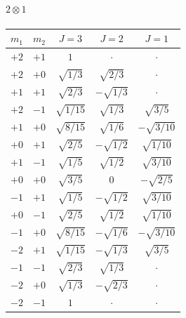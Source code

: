 \documentclass[11pt]{article}
\theoremstyle{plain}
\theoremstyle{definition}
\theoremstyle{remark}
\begin{document}
\paragraph{$2 \otimes 1$}
\begin{center}
\begin{tabular}{cc|ccc}
\toprule
$m_1$ & $m_2$ & $J=3$ & $J=2$ & $J=1$ \\
\midrule
$+2$ & $+1$ & $1$ & $\cdot$ & $\cdot$ \\
\midrule
$+2$ & $+0$ & $\sqrt{1/3}$ & $\sqrt{2/3}$ & $\cdot$ \\
$+1$ & $+1$ & $\sqrt{2/3}$ & $-\sqrt{1/3}$ & $\cdot$ \\
\midrule
$+2$ & $-1$ & $\sqrt{1/15}$ & $\sqrt{1/3}$ & $\sqrt{3/5}$ \\
$+1$ & $+0$ & $\sqrt{8/15}$ & $\sqrt{1/6}$ & $-\sqrt{3/10}$ \\
$+0$ & $+1$ & $\sqrt{2/5}$ & $-\sqrt{1/2}$ & $\sqrt{1/10}$ \\
\midrule
$+1$ & $-1$ & $\sqrt{1/5}$ & $\sqrt{1/2}$ & $\sqrt{3/10}$ \\
$+0$ & $+0$ & $\sqrt{3/5}$ & $0$ & $-\sqrt{2/5}$ \\
$-1$ & $+1$ & $\sqrt{1/5}$ & $-\sqrt{1/2}$ & $\sqrt{3/10}$ \\
\midrule
$+0$ & $-1$ & $\sqrt{2/5}$ & $\sqrt{1/2}$ & $\sqrt{1/10}$ \\
$-1$ & $+0$ & $\sqrt{8/15}$ & $-\sqrt{1/6}$ & $-\sqrt{3/10}$ \\
$-2$ & $+1$ & $\sqrt{1/15}$ & $-\sqrt{1/3}$ & $\sqrt{3/5}$ \\
\midrule
$-1$ & $-1$ & $\sqrt{2/3}$ & $\sqrt{1/3}$ & $\cdot$ \\
$-2$ & $+0$ & $\sqrt{1/3}$ & $-\sqrt{2/3}$ & $\cdot$ \\
\midrule
$-2$ & $-1$ & $1$ & $\cdot$ & $\cdot$ \\
\bottomrule
\end{tabular}
\end{center}
\end{document}
